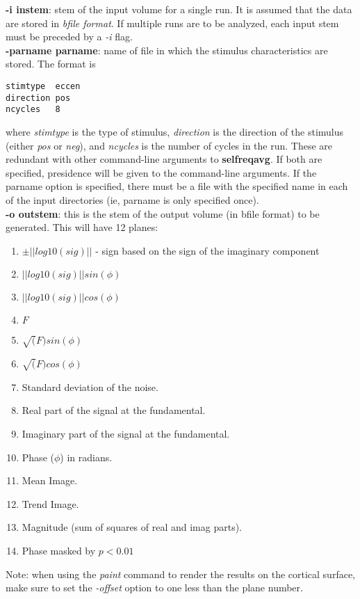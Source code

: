 \documentclass[10pt]{article}
\begin{document}
\noindent
{\bf -i instem}: stem of the input volume for a single run.
It is assumed that the data are stored in {\em bfile format}.  If
multiple runs are to be analyzed, each input stem must be preceded by
a {\em -i} flag.\\

\noindent
{\bf -parname parname}: name of file in which the stimulus characteristics
are stored. The format is
\begin{verbatim}
stimtype  eccen
direction pos
ncycles   8
\end{verbatim}
where {\em stimtype} is the type of stimulus, {\em direction} is the
direction of the stimulus (either {\em pos} or {\em neg}), and {\em
ncycles} is the number of cycles in the run.  These are redundant with
other command-line arguments to {\bf selfreqavg}.  If both are
specified, presidence will be given to the command-line arguments.  If
the parname option is specified, there must be a file with the
specified name in each of the input directories (ie, parname is only
specified once).\\

\noindent
{\bf -o outstem}: this is the stem of the output volume (in bfile format)
to be generated.  This will have 12 planes:
\begin{enumerate}
\item $\pm ||log10(sig)||$ - sign based on the sign of the imaginary component
\item $||log10(sig)|| sin(\phi)$ 
\item $||log10(sig)|| cos(\phi)$ 
\item $F$
\item $\sqrt(F) sin(\phi)$ 
\item $\sqrt(F) cos(\phi)$ 
\item Standard deviation of the noise.
\item Real part of the signal at the fundamental.
\item Imaginary part of the signal at the fundamental.
\item Phase ($\phi$) in radians.
\item Mean Image.
\item Trend Image.
\item Magnitude (sum of squares of real and imag parts).
\item Phase masked by $p<0.01$
\end{enumerate}
Note: when using the {\em paint} command to render the results on the
cortical surface, make sure to set the {\em -offset} option to one
less than the plane number.
\end{document}
